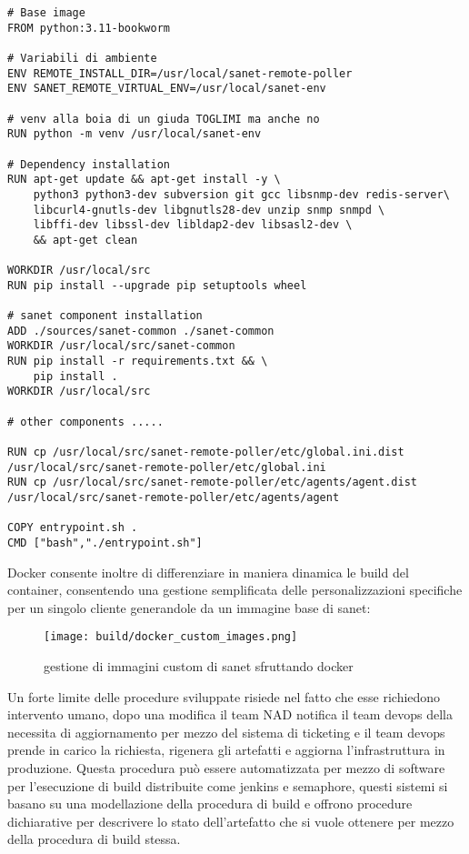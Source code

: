 \begin{lstlisting}[language=Docker]
# Base image
FROM python:3.11-bookworm

# Variabili di ambiente
ENV REMOTE_INSTALL_DIR=/usr/local/sanet-remote-poller
ENV SANET_REMOTE_VIRTUAL_ENV=/usr/local/sanet-env

# venv alla boia di un giuda TOGLIMI ma anche no
RUN python -m venv /usr/local/sanet-env

# Dependency installation
RUN apt-get update && apt-get install -y \
    python3 python3-dev subversion git gcc libsnmp-dev redis-server\
    libcurl4-gnutls-dev libgnutls28-dev unzip snmp snmpd \
    libffi-dev libssl-dev libldap2-dev libsasl2-dev \
    && apt-get clean

WORKDIR /usr/local/src
RUN pip install --upgrade pip setuptools wheel

# sanet component installation
ADD ./sources/sanet-common ./sanet-common
WORKDIR /usr/local/src/sanet-common
RUN pip install -r requirements.txt && \
    pip install .
WORKDIR /usr/local/src

# other components .....

RUN cp /usr/local/src/sanet-remote-poller/etc/global.ini.dist /usr/local/src/sanet-remote-poller/etc/global.ini
RUN cp /usr/local/src/sanet-remote-poller/etc/agents/agent.dist /usr/local/src/sanet-remote-poller/etc/agents/agent

COPY entrypoint.sh .
CMD ["bash","./entrypoint.sh"]
\end{lstlisting}

Docker consente inoltre di differenziare in maniera dinamica le build del container, consentendo una gestione semplificata delle personalizzazioni specifiche per un singolo cliente generandole da un immagine base di sanet:

\begin{figure}[H]
    \centering
    \texttt{[image: build/docker\_custom\_images.png]}
    \caption{gestione di immagini custom di sanet sfruttando docker}
    \label{fig:docker_custom_images}
\end{figure}


Un forte limite delle procedure sviluppate risiede nel fatto che esse richiedono intervento umano, dopo una modifica il team NAD notifica il team devops della necessita di aggiornamento per mezzo del sistema di ticketing e il team devops prende in carico la richiesta, rigenera gli artefatti e aggiorna l'infrastruttura in produzione.
Questa procedura può essere automatizzata per mezzo di software per l'esecuzione di build distribuite come jenkins\cite{jenkins} e semaphore, questi sistemi si basano su una modellazione della procedura di build e offrono procedure dichiarative per descrivere lo stato dell'artefatto che si vuole ottenere per mezzo della procedura di build stessa.

